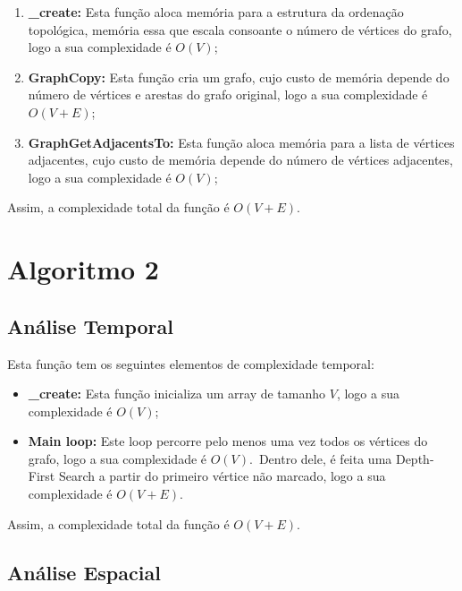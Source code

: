 \begin{enumerate}
    \item \textbf{\_create:} Esta função aloca memória para a estrutura da ordenação topológica, memória essa que escala consoante o número de vértices do grafo, logo a sua complexidade é $O(V)$;
    \item \textbf{GraphCopy:} Esta função cria um grafo, cujo custo de memória depende do número de vértices e arestas do grafo original, logo a sua complexidade é $O(V + E)$;
    \item \textbf{GraphGetAdjacentsTo:} Esta função aloca memória para a lista de vértices adjacentes, cujo custo de memória depende do número de vértices adjacentes, logo a sua complexidade é $O(V)$;
\end{enumerate}

Assim, a complexidade total da função é $O(V + E)$.

\pagebreak

\section{Algoritmo 2}
\label{sec:analise-formal:algoritmo-2}

\subsection{Análise Temporal}
\label{sec:analise-formal:algoritmo-2:analise-temporal}

Esta função tem os seguintes elementos de complexidade temporal:

\begin{itemize}
    \item \textbf{\_create:} Esta função inicializa um array de tamanho $V$, logo a sua complexidade é $O(V)$;
    \item \textbf{Main loop:} Este loop percorre pelo menos uma vez todos os vértices do grafo, logo a sua complexidade é $O(V)$.\ Dentro dele, é feita uma Depth-First Search a partir do primeiro vértice não marcado, logo a sua complexidade é $O(V + E)$.
\end{itemize}

Assim, a complexidade total da função é $O(V + E)$.

\subsection{Análise Espacial}
\label{sec:analise-formal:algoritmo-2:analise-espacial}

